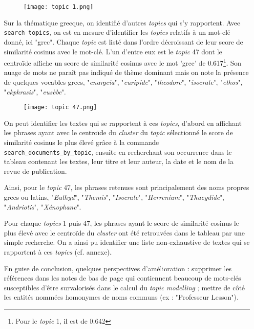 \documentclass{article}
\begin{document}
\begin{figure}[!h]
    \centering
    \texttt{[image: topic 1.png]}
    \label{1}
\end{figure}
\newpage

Sur la thématique grecque, on identifié d'autres \textit{topics} qui s'y rapportent. Avec \verb+search_topics+, on est en mesure d'identifier les \textit{topics} relatifs à un mot-clé donné, ici "grec". Chaque \textit{topic} est listé dans l'ordre décroissant de leur score de similarité cosinus avec le mot-clé. L'un d'entre eux est le \textit{topic} 47 dont le centroïde affiche un score de similarité cosinus avec le mot 'grec' de 0.617\footnote{Pour le \textit{topic} 1, il est de 0.642}. Son nuage de mots ne paraît pas indiqué de thème dominant mais on note la présence de quelques vocables grecs, "\textit{enargeia}", "\textit{euripide}", "\textit{theodore}", "\textit{isocrate}", "\textit{ethos}", "\textit{ekphrasis}", "\textit{eusèbe}".

\begin{figure}[!h]
    \centering
    \texttt{[image: topic 47.png]}
    \label{47}
\end{figure}

On peut identifier les textes qui se rapportent à ces \textit{topics}, d'abord en affichant les phrases ayant avec le centroïde du \textit{cluster} du \textit{topic} sélectionné le score de similarité cosinus le plus élevé grâce à la commande \verb+search_documents_by_topic+, ensuite en recherchant son occurrence dans le tableau contenant les textes, leur titre et leur auteur, la date et le nom de la revue de publication.

Ainsi, pour le \textit{topic} 47, les phrases retenues sont principalement des noms propres grecs ou latins, "\textit{Euthyd}", "\textit{Themis}", "\textit{Isocrate}", "\textit{Herrenium}", "\textit{Thucydide}", "\textit{Andriotis}", "\textit{Xénophane}".

Pour chaque \textit{topics} 1 puis 47, les phrases ayant le score de similarité cosinus le plus élevé avec le centroïde du \textit{cluster} ont été retrouvées dans le tableau par une simple recherche. On a ainsi pu identifier une liste non-exhaustive de textes qui se rapportent à ces \textit{topics} (cf. annexe).


En guise de conclusion, quelques perspectives d'amélioration : supprimer les références dans les notes de bas de page qui contiennent beaucoup de mots-clés susceptibles d'être survalorisés dans le calcul du \textit{topic modelling} ; mettre de côté les entités nommées homonymes de noms communs (ex : "Professeur Lesson").
\end{document}
